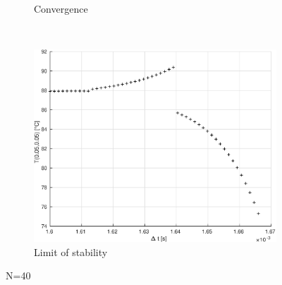 \documentclass[a4paper,12pt,twoside]{article}
\begin{document}
\begin{figure}[h]
\begin{subfigure}[t]{0.45\textwidth}
    \caption{Convergence}
    \label{fig:b-conv40}
  \end{subfigure}
  ~
  \begin{subfigure}[t]{0.45\textwidth}
    \includegraphics[width=\textwidth]{graphs/b_lim40.eps}
    \caption{Limit of stability}
    \label{fig:b-lim40}
  \end{subfigure}
  \caption{N=40}
  \label{fig:b40}
\end{figure}
\end{document}
